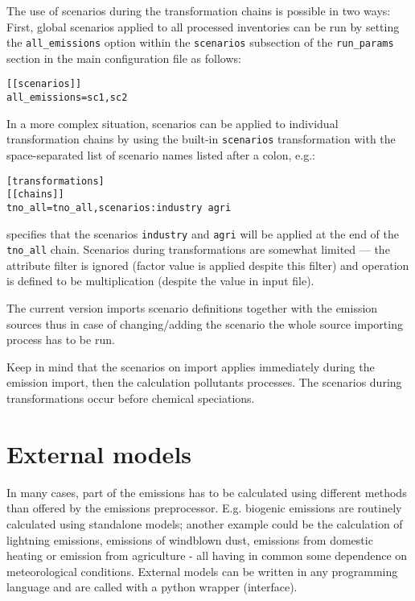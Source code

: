 \documentclass[a4paper,11pt]{article}
\begin{document}
The use of scenarios during the transformation chains is possible in two ways:
First, global scenarios applied to all processed inventories can be run by
setting the \verb|all_emissions| option within the \verb|scenarios| subsection of the \verb|run_params| section in the main configuration file
as follows:
\begin{verbatim}
[[scenarios]]
all_emissions=sc1,sc2
\end{verbatim}

In a more complex situation, scenarios can be applied to individual
transformation chains by using the built-in \verb|scenarios| transformation with the
space-separated list of scenario names listed after a colon, e.g.:

\begin{verbatim}
[transformations]
[[chains]]
tno_all=tno_all,scenarios:industry agri
\end{verbatim}

specifies that the scenarios \verb|industry| and \verb|agri| will be applied
at the end of the \verb|tno_all| chain. Scenarios during transformations are somewhat limited --- the attribute filter is ignored (factor value is applied despite this filter) and operation is defined to be multiplication (despite the value in input file).

The current version imports scenario definitions together with the emission sources thus in case of changing/adding the scenario the whole source importing process has to be run. 

Keep in mind that the scenarios on import applies immediately during the emission import, then the calculation pollutants processes. The scenarios during transformations occur before chemical speciations.

\section{External models}\label{external-models}

In many cases, part of the emissions has to be calculated using
different methods than offered by the emissions preprocessor. E.g.
biogenic emissions are routinely calculated using standalone models;
another example could be the calculation of lightning emissions, emissions of windblown dust,
emissions from domestic heating or emission from agriculture - all
having in common some dependence on meteorological conditions. External
models can be written in any programming language and are called with a
python wrapper (interface).
\end{document}
